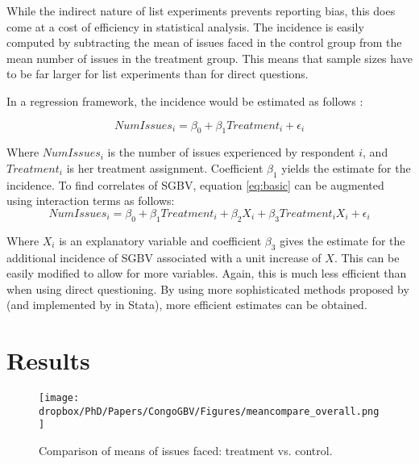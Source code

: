 While the indirect nature of list experiments prevents reporting bias, this does come at a cost of efficiency in statistical analysis. The incidence is easily computed by subtracting the mean of issues faced in the control group from the mean number of issues in the treatment group. This means that sample sizes have to be far larger for list experiments than for direct questions. 

In a regression framework, the incidence would be estimated as follows \citep{Holbrook2010}:

\begin{equation}
\label{eq:basic}
NumIssues_i = \beta_0 + \beta_1 Treatment_i + \epsilon_i
\end{equation}

Where \(NumIssues_i\) is the number of issues experienced by respondent $i$, and \(Treatment_i\) is her treatment assignment. Coefficient \(\beta_1\) yields the estimate for the incidence. To find correlates of SGBV, equation \ref{eq:basic} can be augmented using interaction terms as follows: 
\begin{equation}
\label{eq:interaction}
NumIssues_i = \beta_0 + \beta_1 Treatment_i + \beta_2 X_i + \beta_3 Treatment_i X_i + \epsilon_i
\end{equation}

Where \(X_i\) is an explanatory variable and coefficient \(\beta_3\) gives the estimate for the additional incidence of SGBV associated with a unit increase of \(X\). This can be easily modified to allow for more variables. Again, this is much less efficient than when using direct questioning. By using more sophisticated methods proposed by \citet{Imai2011} (and implemented by \cite{Tsai2019} in Stata), more efficient estimates can be obtained. 




\section{Results}

\begin{figure}[htb]
  \texttt{[image: \\dropbox/PhD/Papers/CongoGBV/Figures/meancompare\_overall.png]}
  \caption{Comparison of means of issues faced: treatment vs. control.}
  \label{fig:meancompare_overall}
\end{figure}

